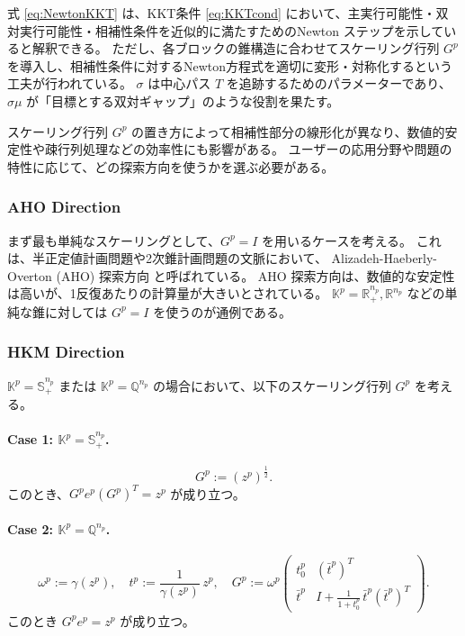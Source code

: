 \documentclass{jsarticle}
\begin{document}
式 \eqref{eq:NewtonKKT} は、KKT条件 \eqref{eq:KKTcond} において、主実行可能性・双対実行可能性・相補性条件を近似的に満たすためのNewton ステップを示していると解釈できる。
ただし、各ブロックの錐構造に合わせてスケーリング行列 $G^p$ を導入し、相補性条件に対するNewton方程式を適切に変形・対称化するという工夫が行われている。
$\sigma$ は中心パス $T$ を追跡するためのパラメーターであり、$\sigma\mu$ が「目標とする双対ギャップ」のような役割を果たす。

スケーリング行列 $G^p$ の置き方によって相補性部分の線形化が異なり、数値的安定性や疎行列処理などの効率性にも影響がある。
ユーザーの応用分野や問題の特性に応じて、どの探索方向を使うかを選ぶ必要がある。

\medskip

\subsubsection{AHO Direction}

まず最も単純なスケーリングとして、$G^p=I$ を用いるケースを考える。
これは、半正定値計画問題や2次錐計画問題の文脈において、 Alizadeh-Haeberly-Overton (AHO) 探索方向 \cite{Alizadeh1998} と呼ばれている。
AHO 探索方向は、数値的な安定性は高いが、1反復あたりの計算量が大きいとされている。
$\mathbb{K}^p = \mathbb{R}^{n_p}_+, \mathbb{R}^{n_p}$ などの単純な錐に対しては $G^p=I$ を使うのが通例である。

\medskip

\subsubsection{HKM Direction}

\noindent

$\mathbb{K}^p = \mathbb{S}^{n_p}_+$ または $\mathbb{K}^p = \mathbb{Q}^{n_p}$ の場合において、以下のスケーリング行列 $G^p$ を考える。

\paragraph{Case 1: \(\mathbb{K}^p = \mathbb{S}^{n_p}_+\).}
\[
  G^p := (z^p)^{\tfrac12}.
\]
このとき、$G^p e^p (G^p)^T = z^p$ が成り立つ。

\paragraph{Case 2: \(\mathbb{K}^p = \mathbb{Q}^{n_p}\).}
\[
  \omega^p := \gamma(z^p), 
  \quad
  t^p := \frac{1}{\gamma(z^p)}\, z^p,
  \quad
  G^p :=
  \omega^p
  \begin{pmatrix}
    t^p_0 & (\bar{t}^p)^T \\
    \bar{t}^p & I + \frac{1}{1+t^p_0}\,\bar{t}^p(\bar{t}^p)^T
  \end{pmatrix}.
\]
このとき $G^p e^p = z^p$ が成り立つ。
\end{document}

